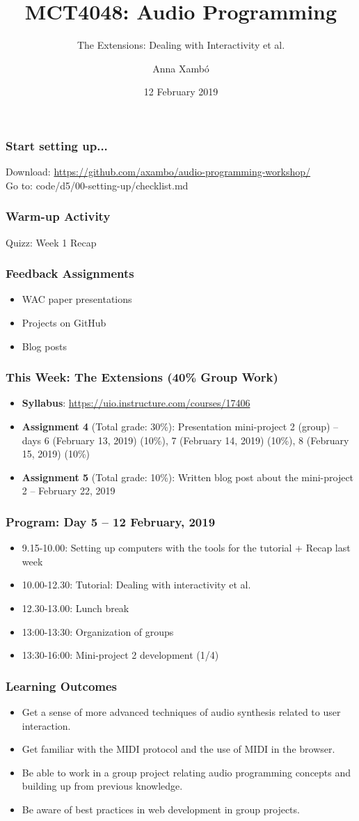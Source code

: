 \documentclass[screen, aspectratio=43]{beamer}
\title[AP-intro]{MCT4048: Audio Programming}
\subtitle{The Extensions: Dealing with Interactivity et al.}
\author[A. Xamb{\'o}]{Anna Xamb{\'o}}
\institute[NTNU]{Department of Music, NTNU}
\date{12 February 2019}
\begin{document}
\begin{frame}
  \titlepage
\end{frame}
%
%
\begin{frame}
\frametitle{Start setting up...}
Download: \url{https://github.com/axambo/audio-programming-workshop/} 
\\
\vspace{10 mm}
Go to: \textrm{code/d5/00-setting-up/checklist.md}
\end{frame}
%
\begin{frame}
\frametitle{Warm-up Activity}
Quizz: Week 1 Recap
\end{frame}
%
\begin{frame}
\frametitle{Feedback Assignments}
\begin{itemize}
\item WAC paper presentations
\item Projects on GitHub
\item Blog posts
\end{itemize}
\end{frame}
%
\begin{frame}
\frametitle{This Week: The Extensions (40\% Group Work)}
\begin{itemize}
\item \textbf{Syllabus}: \url{https://uio.instructure.com/courses/17406}
\item \textbf{Assignment 4} (Total grade: 30\%): Presentation mini-project 2 (group) -- days 6 (February 13, 2019) (10\%), 7 (February 14, 2019) (10\%), 8 (February 15, 2019) (10\%)
\item \textbf{Assignment 5} (Total grade: 10\%):  Written blog post about the mini-project 2 -- February 22, 2019
\end{itemize}
\end{frame}
%
\begin{frame}
\frametitle{Program: Day 5 -- 12 February, 2019}
\begin{itemize}
\item 9.15-10.00: Setting up computers with the tools for the tutorial + Recap last week
\item 10.00-12.30: Tutorial: Dealing with interactivity et al.
\item 12.30-13.00: Lunch break
\item 13:00-13:30: Organization of groups
\item 13:30-16:00: Mini-project 2 development (1/4)
\end{itemize}
\end{frame}
%
\begin{frame}
\frametitle{Learning Outcomes}
\begin{itemize}
\item Get a sense of more advanced techniques of audio synthesis related to user interaction.
\item Get familiar with the MIDI protocol and the use of MIDI in the browser.
\item Be able to work in a group project relating audio programming concepts and building up from previous knowledge.
\item Be aware of best practices in web development in group projects.
\end{itemize}
\end{frame}
\end{document}
